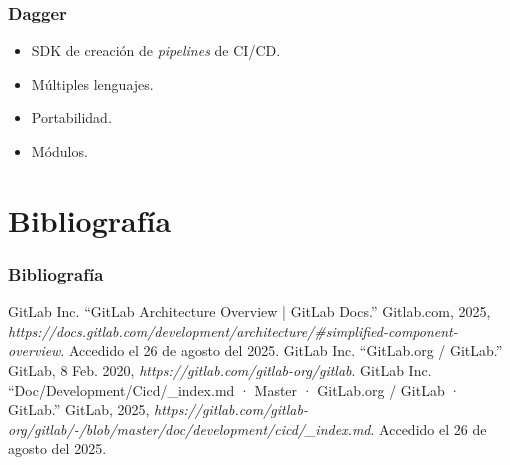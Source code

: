 \documentclass{beamer}
\begin{document}
\begin{frame}
    \frametitle{Dagger}
    \begin{itemize}
        \item SDK de creación de \textit{pipelines} de CI/CD. \pause
        \item Múltiples lenguajes. \pause
        \item Portabilidad. \pause
        \item Módulos.
    \end{itemize}
\end{frame}

\section{Bibliografía}
\begin{frame}
    \frametitle{Bibliografía}
    \begin{thebibliography}{99}
        \scriptsize
         GitLab Inc. ``GitLab Architecture Overview | GitLab Docs.'' Gitlab.com, 2025, {\it https://docs.gitlab.com/development/architecture/\#simplified-component-overview}. Accedido el 26 de agosto del 2025.
         GitLab Inc. ``GitLab.org / GitLab.'' GitLab, 8 Feb. 2020, {\it https://gitlab.com/gitlab-org/gitlab}.
         GitLab Inc. ``Doc/Development/Cicd/\_index.md · Master · GitLab.org / GitLab · GitLab.'' GitLab, 2025, {\it https://gitlab.com/gitlab-org/gitlab/-/blob/master/doc/development/cicd/\_index.md}. Accedido el 26 de agosto del 2025.
    \end{thebibliography}
\end{frame}
\end{document}
